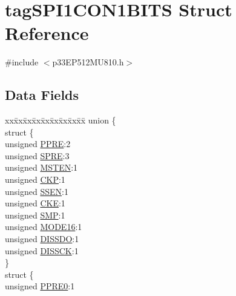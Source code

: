 \hypertarget{structtag_s_p_i1_c_o_n1_b_i_t_s}{}\section{tag\+S\+P\+I1\+C\+O\+N1\+B\+I\+TS Struct Reference}
\label{structtag_s_p_i1_c_o_n1_b_i_t_s}


{\ttfamily \#include $<$p33\+E\+P512\+M\+U810.\+h$>$}

\subsection*{Data Fields}
\begin{DoxyCompactItemize}
\item 
\begin{tabbing}
xx\=xx\=xx\=xx\=xx\=xx\=xx\=xx\=xx\=\kill
union \{\\
\>struct \{\\
\>\>unsigned \hyperlink{structtag_s_p_i1_c_o_n1_b_i_t_s_a328a5a76e4d964cd323b8fc7ec480a65}{PPRE}:2\\
\>\>unsigned \hyperlink{structtag_s_p_i1_c_o_n1_b_i_t_s_ac4fc398d060ce31eebf7055f67519250}{SPRE}:3\\
\>\>unsigned \hyperlink{structtag_s_p_i1_c_o_n1_b_i_t_s_acb4900cdfd8a4b59377c2aa8a4fc82c5}{MSTEN}:1\\
\>\>unsigned \hyperlink{structtag_s_p_i1_c_o_n1_b_i_t_s_afb5f6f71e7650f128b6e5c04036cd48f}{CKP}:1\\
\>\>unsigned \hyperlink{structtag_s_p_i1_c_o_n1_b_i_t_s_ae77e6e9fafcdae4e5b7f261d00459ade}{SSEN}:1\\
\>\>unsigned \hyperlink{structtag_s_p_i1_c_o_n1_b_i_t_s_ad6e30ba11b5574f8a5f548a818b64186}{CKE}:1\\
\>\>unsigned \hyperlink{structtag_s_p_i1_c_o_n1_b_i_t_s_a94751e12e00a82cf122e0d82aa7cfdbf}{SMP}:1\\
\>\>unsigned \hyperlink{structtag_s_p_i1_c_o_n1_b_i_t_s_ae096fb6fc65299accb5c75e3d306e425}{MODE16}:1\\
\>\>unsigned \hyperlink{structtag_s_p_i1_c_o_n1_b_i_t_s_a2cbce11395d8c5eb5f91ba935acaea6b}{DISSDO}:1\\
\>\>unsigned \hyperlink{structtag_s_p_i1_c_o_n1_b_i_t_s_ac9a14e83bad7551e878fdaed7d16bfa3}{DISSCK}:1\\
\>\} \\
\>struct \{\\
\>\>unsigned \hyperlink{structtag_s_p_i1_c_o_n1_b_i_t_s_ae7a242158d2a5a81e609501ba93b1d20}{PPRE0}:1\\

\end{tabbing}
\end{DoxyCompactItemize}
